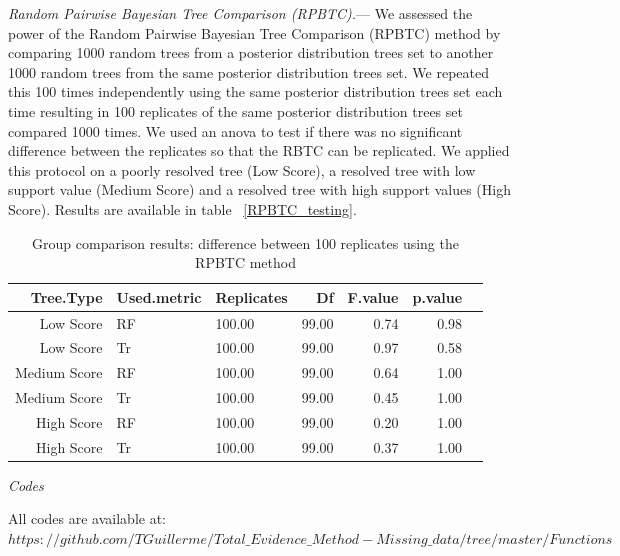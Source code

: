\documentclass[12pt,letterpaper]{article}
\renewcommand{\subsection}[1]{%
\bigskip
\begin{center}
\begin{large}
\normalfont\itshape #1
\end{large}
\end{center}}
\renewcommand{\subsubsection}[1]{%
\vspace{2ex}
\noindent
\textit{#1.}---}
\begin{document}
\subsubsection{Random Pairwise Bayesian Tree Comparison (RPBTC)}
We assessed the power of the Random Pairwise Bayesian Tree Comparison (RPBTC) method by comparing 1000 random trees from a posterior distribution trees set to another 1000 random trees from the same posterior distribution trees set.
We repeated this 100 times independently using the same posterior distribution trees set each time resulting in 100 replicates of the same posterior distribution trees set compared 1000 times.
We used an anova to test if there was no significant difference between the replicates so that the RBTC can be replicated.
We applied this protocol on a poorly resolved tree (Low Score), a resolved tree with low support value (Medium Score) and a resolved tree with high support values (High Score).
Results are available in table ~\ref{RPBTC_testing}. %

\begin{table}[ht]
\caption{Group comparison results: difference between 100 replicates using the RPBTC method} %
\centering
\begin{tabular}{rllrrrr}
  \hline
  Tree.Type & Used.metric & Replicates & Df & F.value & p.value \\ 
  \hline
  Low Score & RF & 100.00 & 99.00 & 0.74 & 0.98 \\ 
  Low Score & Tr & 100.00 & 99.00 & 0.97 & 0.58 \\ 
  Medium Score & RF & 100.00 & 99.00 & 0.64 & 1.00 \\ 
  Medium Score & Tr & 100.00 & 99.00 & 0.45 & 1.00 \\ 
  High Score & RF & 100.00 & 99.00 & 0.20 & 1.00 \\ 
  High Score & Tr & 100.00 & 99.00 & 0.37 & 1.00 \\ 
  \hline
\end{tabular}
\end{table}
\label{RPBTC_testing}

\subsection{Codes}
All codes are available at: $https://github.com/TGuillerme/Total\_Evidence\_Method-Missing\_data/tree/master/Functions$

\end{document}
